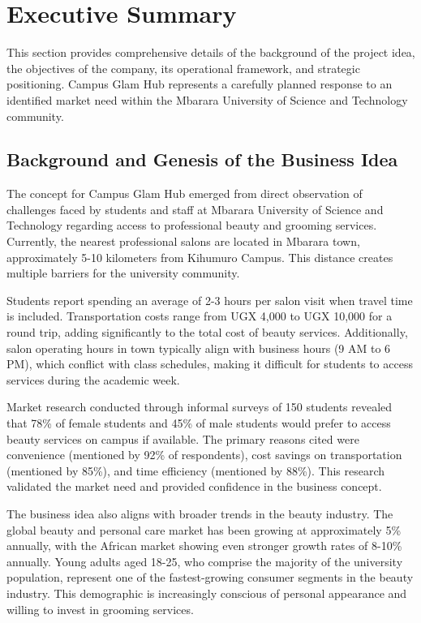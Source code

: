 \documentclass[a4paper,12pt]{article}
\begin{document}
\newpage
\section{Executive Summary}

This section provides comprehensive details of the background of the project idea, the objectives of the company, its operational framework, and strategic positioning. Campus Glam Hub represents a carefully planned response to an identified market need within the Mbarara University of Science and Technology community.

\subsection{Background and Genesis of the Business Idea}

The concept for Campus Glam Hub emerged from direct observation of challenges faced by students and staff at Mbarara University of Science and Technology regarding access to professional beauty and grooming services. Currently, the nearest professional salons are located in Mbarara town, approximately 5-10 kilometers from Kihumuro Campus. This distance creates multiple barriers for the university community.

Students report spending an average of 2-3 hours per salon visit when travel time is included. Transportation costs range from UGX 4,000 to UGX 10,000 for a round trip, adding significantly to the total cost of beauty services. Additionally, salon operating hours in town typically align with business hours (9 AM to 6 PM), which conflict with class schedules, making it difficult for students to access services during the academic week.

Market research conducted through informal surveys of 150 students revealed that 78\% of female students and 45\% of male students would prefer to access beauty services on campus if available. The primary reasons cited were convenience (mentioned by 92\% of respondents), cost savings on transportation (mentioned by 85\%), and time efficiency (mentioned by 88\%). This research validated the market need and provided confidence in the business concept.

The business idea also aligns with broader trends in the beauty industry. The global beauty and personal care market has been growing at approximately 5\% annually, with the African market showing even stronger growth rates of 8-10\% annually. Young adults aged 18-25, who comprise the majority of the university population, represent one of the fastest-growing consumer segments in the beauty industry. This demographic is increasingly conscious of personal appearance and willing to invest in grooming services.
\end{document}
